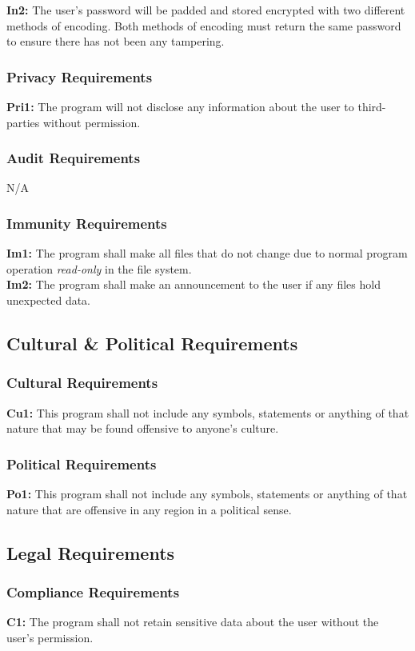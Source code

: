 \documentclass[titlepage]{article}
\begin{document}
\noindent\textbf{In2:} The user's password will be padded and stored encrypted with two different methods of encoding. Both methods of encoding must return the same password to ensure there has not been any tampering.
\subsubsection{Privacy Requirements}
\textbf{Pri1:} The program will not disclose any information about the user to third-parties without permission.
\subsubsection{Audit Requirements}
N/A
\subsubsection{Immunity Requirements}
\textbf{Im1:} The program shall make all files that do not change due to normal program operation \textit{read-only} in the file system.\\

\noindent\textbf{Im2:} The program shall make an announcement to the user if any files hold unexpected data.

\subsection{Cultural \& Political Requirements}
\subsubsection{Cultural Requirements}
\textbf{Cu1:} This program shall not include any symbols, statements or anything of that nature that may be found offensive to anyone's culture.
\subsubsection{Political Requirements}
\textbf{Po1:} This program shall not include any symbols, statements or anything of that nature that are offensive in any region in a political sense.

\subsection{Legal Requirements}
\subsubsection{Compliance Requirements}
\textbf{C1:} The program shall not retain sensitive data about the user without the user's permission.
\end{document}
